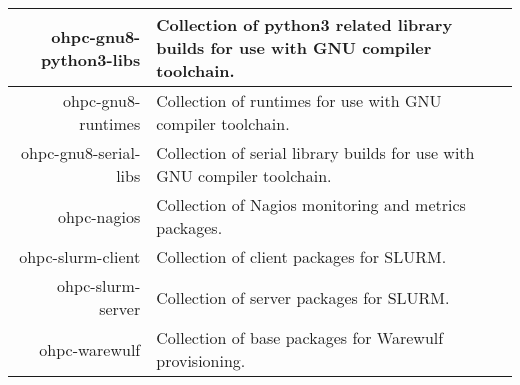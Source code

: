 \begin{tabularx}{\textwidth}{r|X}
\hline
ohpc-gnu8-python3-libs & Collection of python3 related library builds for use with GNU compiler toolchain. \\ 
\hline
ohpc-gnu8-runtimes & Collection of runtimes for use with GNU compiler toolchain. \\ 
\hline
ohpc-gnu8-serial-libs & Collection of serial library builds for use with GNU compiler toolchain. \\ 
\hline
ohpc-nagios & Collection of Nagios monitoring and metrics packages. \\ 
\hline
ohpc-slurm-client & Collection of client packages for SLURM. \\ 
\hline
ohpc-slurm-server & Collection of server packages for SLURM. \\ 
\hline
ohpc-warewulf & Collection of base packages for Warewulf provisioning. \\ 
\hline
\bottomrule
\end{tabularx}
